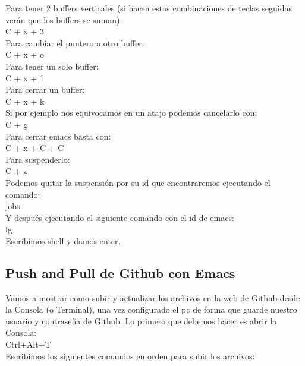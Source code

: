 Para tener 2 buffers verticales (si hacen estas combinaciones de teclas seguidas verán que los buffers se suman):\\
C + x + 3\\

Para cambiar el puntero a otro buffer:\\
C + x + o\\

Para tener un solo buffer:\\
C + x + 1\\

Para cerrar un buffer:\\
C + x + k\\

Si por ejemplo nos equivocamos en un atajo podemos cancelarlo con:\\
C + g\\

Para cerrar emacs basta con:\\
C + x + C + C\\

Para suspenderlo:\\
C + z\\

Podemos quitar la suspensión por su id que encontraremos ejecutando el comando:\\

jobs\\

Y después ejecutando el siguiente comando con el id de emacs:\\

fg\\

Escribimos shell y damos enter. \\


\subsection{Push and Pull de Github con Emacs}

Vamos a mostrar como subir y actualizar los archivos en la web de Github desde la Consola (o Terminal), una vez configurado el pc de forma que guarde nuestro usuario y contraseña de Github. Lo primero que debemos hacer es abrir la Consola:\\

Ctrl+Alt+T\\

Escribimos los siguientes comandos en orden para subir los archivos:\\

